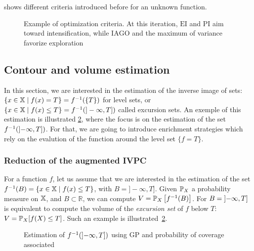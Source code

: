 \documentclass[../../Main_ManuscritThese.tex]{subfiles}
\newcommand\imgpath{/home/victor/acadwriting/Manuscrit/Text/Chapter4/img/}
\begin{document}
 shows different criteria introduced before for an unknown function.
\begin{figure}[ht!]
  \centering
  
  \caption[Optimization criteria for GP]{\label{fig:example_optimization_criteria} Example of optimization criteria. At this iteration, $\mathrm{EI}$ and $\mathrm{PI}$ aim toward intensification, while $\mathrm{IAGO}$ and the maximum of variance favorize exploration}
\end{figure}
\clearpage
%
\subsection{Contour and volume estimation}
\label{sec:GP_vol_estim}
In this section, we are interested in the estimation of the inverse image of sets: $\{x \in \mathbb{X} \mid f(x) = T\}=f^{-1}(\{T\})$ for level sets, or $\{x\in\mathbb{X} \mid f(x) \leq T\} = f^{-1}(]-\infty, T])$ called excursion sets. An exemple of this estimation is illustrated \cref{fig:prob_coverage_example}, where the focus is on the estimation of the set $f^{-1}(\interval[open left]{-\infty}{T})$. For that, we are going to introduce enrichment strategies which rely on the evalution of the function around the level set $\{f=T\}$.

\subsubsection{Reduction of the augmented IVPC}
For a function $f$, let us assume that we are interested in the
estimation of the set
$f^{-1}(B) = \{x \in \mathbb{X} \mid f(x) \leq T\}$, with
$B = ]-\infty, T]$. Given $\mathbb{P}_{X}$ a probability
measure on $\mathbb{X}$, and $B\subset \mathbb{R}$, we can compute
$V=\mathbb{P}_{X}\left[f^{-1}(B)\right]$. For
$B = \interval[open left]{-\infty}{T}$ is equivalent to compute the
volume of the \emph{excursion set} of $f$ below $T$:
$V=\mathbb{P}_{X}[f(X) \leq T]$. Such an example is illustrated~\cref{fig:prob_coverage_example}.
\begin{figure}[ht]
  \centering
  
  \caption{\label{fig:prob_coverage_example} Estimation of $f^{-1}(\interval[open left]{-\infty}{T})$ using GP and probability of coverage associated}
\end{figure}
\end{document}
